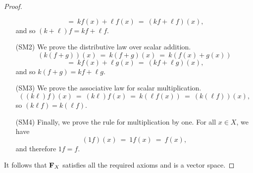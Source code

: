 \begin{proof}
\begin{itemize}
\begin{equation*}
      ~=~ kf(x) + \ell f(x)
      ~=~ (kf + \ell f) (x),
    \end{equation*}
    and so $(k + \ell ) f=kf + \ell f$.
  \item[(SM2)] We prove the distributive law over scalar addition.
    \begin{equation*}
      (k(f + g)) (x)
      ~=~ k(f + g) (x)
      ~=~ k(f(x) + g(x))
    \end{equation*}
    \begin{equation*}
      ~=~ kf(x) + \ell g(x)
      ~=~ (kf + \ell g) (x),
    \end{equation*}
    and so $k(f + g) = kf + \ell g$.
  \item[(SM3)] We prove the associative law for scalar multiplication.
    \begin{equation*}
      ((k\ell ) f) (x)
      ~=~ (k\ell) f(x)
      ~=~ k(\ell f(x))
      ~=~ (k(\ell f)) (x),
    \end{equation*}
    so $(k\ell f) =k(\ell f)$.
  \item[(SM4)] Finally, we prove the rule for multiplication by one.
    For all $x\in X$, we have
    \begin{equation*}
      (1f) ( x) ~=~ 1f(x) ~=~f(x),
    \end{equation*}
    and therefore $1f=f$.
  \end{itemize}

  It follows that $\mathbf{F}_X$ satisfies all the required axioms and is a
  vector space.
\end{proof}

